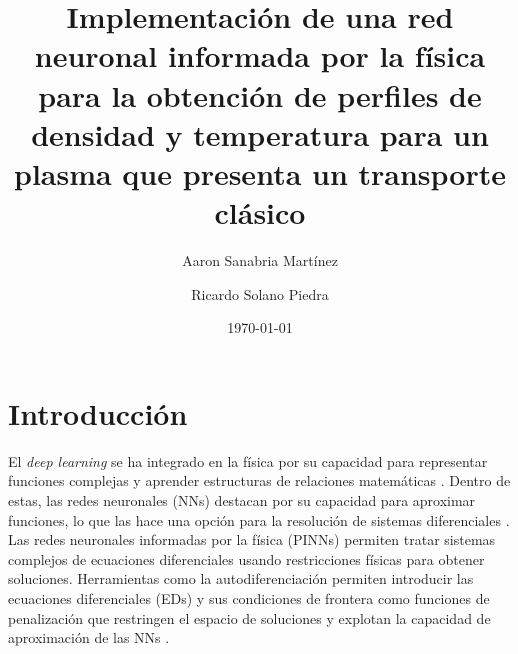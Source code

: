 \title			{Implementación de una red neuronal informada por la física para la obtención de perfiles de densidad y temperatura para un plasma que presenta un transporte clásico}
\author         {Aaron Sanabria Martínez}
\author         {Ricardo Solano Piedra}
\date{\today} %

\begin{abstract}
\lipsum[4]
\end{abstract}

\maketitle



\section{Introducción} 

El \textit{deep learning} se ha integrado en la física por su capacidad para representar funciones complejas y aprender estructuras de relaciones matemáticas \cite{carleo2019}. Dentro de estas, las redes neuronales (NNs) destacan por su capacidad para aproximar funciones, lo que las hace una opción para la resolución de sistemas diferenciales \cite{lagaris1998}.  Las redes neuronales informadas por la física (PINNs) permiten tratar sistemas complejos de ecuaciones diferenciales usando restricciones físicas para obtener soluciones. Herramientas como la autodiferenciación permiten introducir las ecuaciones diferenciales (EDs) y sus condiciones de frontera como funciones de penalización que restringen el espacio de soluciones y explotan la capacidad de aproximación de las NNs \cite{raissi2019, baydin2018}.

